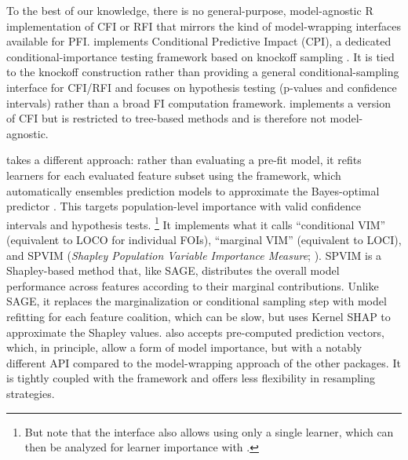 To the best of our knowledge, there is no general-purpose, model-agnostic R implementation of CFI or RFI that mirrors the kind of model-wrapping interfaces available for PFI.
 implements Conditional Predictive Impact (CPI), a dedicated conditional-importance testing framework based on knockoff sampling \citep{watson2021testingconditional}.
It is tied to the knockoff construction rather than providing a general conditional-sampling interface for CFI/RFI and focuses on hypothesis testing (p-values and confidence intervals) rather than a broad FI computation framework.
 implements a version of CFI but is restricted to tree-based methods and is therefore not model-agnostic.

 takes a different approach: rather than evaluating a pre-fit model, it refits learners for each evaluated feature subset using the  framework, which automatically ensembles prediction models to approximate the Bayes-optimal predictor \citep{williamson2023generalframeworkb}.
This targets population-level importance with valid confidence intervals and hypothesis tests.
\footnote{But note that the  interface also allows using only a single learner, which can then be analyzed for learner importance with .}
It implements what it calls ``conditional VIM'' (equivalent to LOCO for individual FOIs), ``marginal VIM'' (equivalent to LOCI), and SPVIM (\emph{Shapley Population Variable Importance Measure}; \citet{williamson2020efficientnonparametrica}).
SPVIM is a Shapley-based method that, like SAGE, distributes the overall model performance across features according to their marginal contributions.
Unlike SAGE, it replaces the marginalization or conditional sampling step with model refitting for each feature coalition, which can be slow, but uses Kernel SHAP \citep{covert2021improvingkernelshap} to approximate the Shapley values.
 also accepts pre-computed prediction vectors, which, in principle, allow a form of model importance, but with a notably different API compared to the model-wrapping approach of the other packages.
It is tightly coupled with the  framework and offers less flexibility in resampling strategies.

